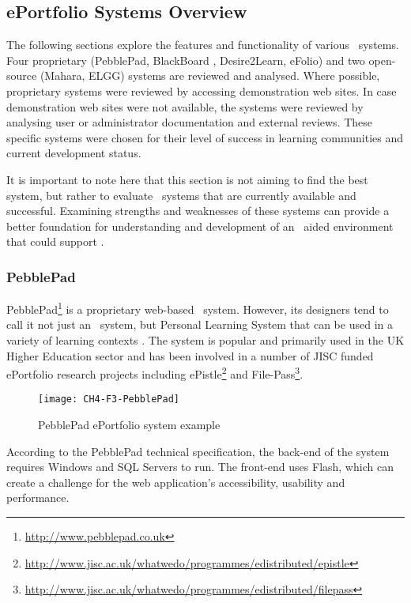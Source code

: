 \subsection{ePortfolio Systems Overview}
The following sections explore the features and functionality of various
\ep~systems. Four proprietary (PebblePad, BlackBoard \ep, Desire2Learn, eFolio)
and two open-source (Mahara, ELGG) systems are reviewed and analysed. Where
possible, proprietary systems were reviewed by accessing demonstration web
sites. In case demonstration web sites were not available, the systems were
reviewed by analysing user or administrator documentation and external reviews.
These specific systems were chosen for their level of success in learning
communities and current development status. 

It is important to note here that this section is not aiming to find the best
system, but rather to evaluate \ep~systems that are currently available and
successful. Examining strengths and weaknesses of these systems can provide a
better foundation for understanding and development of an \ep~aided environment
that could support \LLLsn.


\subsubsection{PebblePad}

PebblePad\footnote{\url{http://www.pebblepad.co.uk}} is a proprietary web-based
\ep~system. However, its designers tend to call it not just an \ep~system, but
Personal Learning System that can be used in a variety of learning contexts
\citep{PebbleLearningLtd2010}. The system is popular and primarily used in the
UK Higher Education sector and has been involved in a number of JISC funded
ePortfolio research projects including
ePistle\footnote{\url{http://www.jisc.ac.uk/whatwedo/programmes/edistributed/epistle}}
and File-Pass\footnote{\url{http://www.jisc.ac.uk/whatwedo/programmes/edistributed/filepass}}.

\begin{figure}[htb]
\centering
\texttt{[image: CH4-F3-PebblePad]}
\caption[PebblePad ePortfolio system example]{PebblePad ePortfolio system example
\citep{PebbleLearningLtd}}
\label{fig:ppep}
\end{figure}

According to the PebblePad technical specification, the back-end of the system
requires Windows and SQL Servers to run. The front-end uses Flash, which can
create a challenge for the web application's accessibility, usability and
performance.

